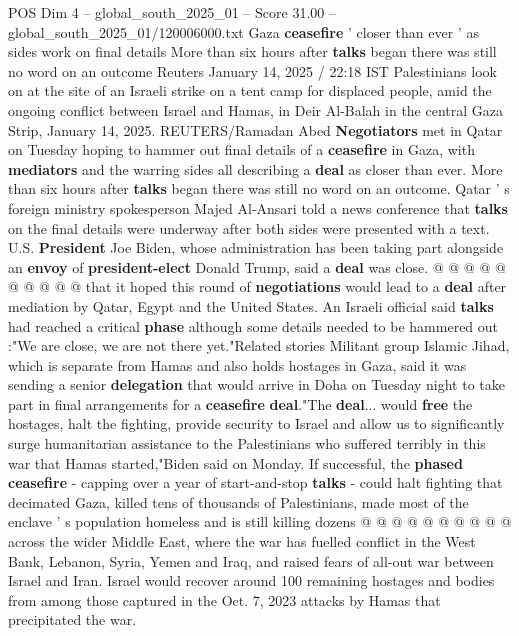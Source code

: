 \begin{textsample}{POS Dim 4 – global\_south\_2025\_01 – Score 31.00 – global\_south\_2025\_01/120006000.txt}  \label{ex:f4_pos_002}
Gaza \textbf{ceasefire} ' closer than ever ' as sides work on final details More than six hours after \textbf{talks} began there was still no word on an outcome Reuters January 14, 2025 / 22:18 IST Palestinians look on at the site of an Israeli strike on a tent camp for displaced people, amid the ongoing conflict between Israel and Hamas, in Deir Al-Balah in the central Gaza Strip, January 14, 2025.
REUTERS/Ramadan Abed \textbf{Negotiators} met in Qatar on Tuesday hoping to hammer out final details of a \textbf{ceasefire} in Gaza, with \textbf{mediators} and the warring sides all describing a \textbf{deal} as closer than ever.
More than six hours after \textbf{talks} began there was still no word on an outcome.
Qatar ' s foreign ministry spokesperson Majed Al-Ansari told a news conference that \textbf{talks} on the final details were underway after both sides were presented with a text.
U.S. \textbf{President} Joe Biden, whose administration has been taking part alongside an \textbf{envoy} of \textbf{president-elect} Donald Trump, said a \textbf{deal} was close. @ @ @ @ @ @ @ @ @ @ that it hoped this round of \textbf{negotiations} would lead to a \textbf{deal} after mediation by Qatar, Egypt and the United States.
An Israeli official said \textbf{talks} had reached a critical \textbf{phase} although some details needed to be hammered out :"We are close, we are not there yet."Related stories Militant group Islamic Jihad, which is separate from Hamas and also holds hostages in Gaza, said it was sending a senior \textbf{delegation} that would arrive in Doha on Tuesday night to take part in final arrangements for a \textbf{ceasefire} \textbf{deal}."The \textbf{deal}... would \textbf{free} the hostages, halt the fighting, provide security to Israel and allow us to significantly surge humanitarian assistance to the Palestinians who suffered terribly in this war that Hamas started,"Biden said on Monday.
If successful, the \textbf{phased} \textbf{ceasefire} - capping over a year of start-and-stop \textbf{talks} - could halt fighting that decimated Gaza, killed tens of thousands of Palestinians, made most of the enclave ' s population homeless and is still killing dozens @ @ @ @ @ @ @ @ @ @ across the wider Middle East, where the war has fuelled conflict in the West Bank, Lebanon, Syria, Yemen and Iraq, and raised fears of all-out war between Israel and Iran.
Israel would recover around 100 remaining hostages and bodies from among those captured in the Oct. 7, 2023 attacks by Hamas that precipitated the war.

\end{textsample}
